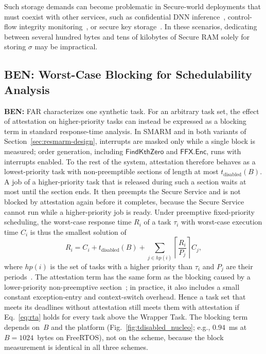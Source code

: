 \documentclass{ieeeaccess}
\DeclareRobustCommand{\ben}[1]{{\color{BENcolor}\textbf{BEN:} #1}}
\begin{document}
Such storage demands can become problematic in Secure-world deployments that must coexist with other services, such as confidential DNN inference~\cite{tslices}, control-flow integrity monitoring~\cite{tzmcfi}, or secure key storage~\cite{silabs-secure-key-storage}.
In these scenarios, dedicating between several hundred bytes and tens of kilobytes of Secure RAM solely for storing $\sigma$ may be impractical.

\subsection{\ben{Worst-Case Blocking for Schedulability Analysis}}
\label{sec:blocking}
\ben{FAR characterizes one synthetic task.
For an arbitrary task set, the effect of attestation on higher-priority tasks can instead be expressed as a blocking term in standard response-time analysis.
In SMARM and in both variants of Section~\ref{sec:resmarm-design}, interrupts are masked only while a single block is measured; order generation, including $\mathsf{FindKthZero}$ and $\mathsf{FFX.Enc}$, runs with interrupts enabled.
To the rest of the system, attestation therefore behaves as a lowest-priority task with non-preemptible sections of length at most $t_{\text{disabled}}(B)$.
A job of a higher-priority task that is released during such a section waits at most until the section ends.
It then preempts the Secure Service and is not blocked by attestation again before it completes, because the Secure Service cannot run while a higher-priority job is ready.
Under preemptive fixed-priority scheduling, the worst-case response time $R_i$ of a task $\tau_i$ with worst-case execution time $C_i$ is thus the smallest solution of
\begin{equation}
  R_i = C_i + t_{\text{disabled}}(B) + \sum_{j \in hp(i)} \left\lceil \frac{R_i}{P_j} \right\rceil C_j,
  \label{eq:rta}
\end{equation}
where $hp(i)$ is the set of tasks with a higher priority than $\tau_i$ and $P_j$ are their periods~\cite{joseph1986response,audsley1993applying,buttazzo2011hard}.
The attestation term has the same form as the blocking caused by a lower-priority non-preemptive section~\cite{sha1990priority}; in practice, it also includes a small constant exception-entry and context-switch overhead.
Hence a task set that meets its deadlines without attestation still meets them with attestation if Eq.~\eqref{eq:rta} holds for every task above the Wrapper Task.
The blocking term depends on~$B$ and the platform (Fig.~\ref{fig:tdisabled_nucleo}; e.g., $0.94$~ms at $B = 1024$~bytes on FreeRTOS), not on the scheme, because the block measurement is identical in all three schemes.
}
\end{document}
